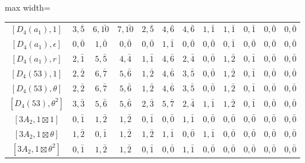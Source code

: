 \begin{table}[ht]
\begin{adjustbox}{max width=\linewidth}
\begin{tabular}{|c|ccccccccccc|}
        $[D_4(a_1), 1]$        & $3, \bar{5}$ & $6, \bar{10}$ & $7, \bar{10}$ & $2, \bar{5}$ & $4, \bar{6}$ & $4, \bar{6}$ & $1, \bar{1}$ & $1, \bar{1}$ & $0, \bar{1}$ & $0, \bar{0}$ & $0, \bar{0}$ \\ 
        $[D_4(a_1), \epsilon]$  & $0, \bar{0}$ & $1, \bar{0}$ & $0, \bar{0}$ & $0, \bar{0}$ & $1, \bar{1}$ & $0, \bar{0}$ & $0, \bar{0}$ & $0, \bar{1}$ & $0, \bar{0}$ & $0, \bar{0}$ & $0, \bar{0}$ \\ 
        $[D_4(a_1), r]$        & $2, \bar{1}$ & $5, \bar{5}$ & $4, \bar{4}$ & $1, \bar{1}$ & $4, \bar{6}$ & $2, \bar{4}$ & $0, \bar{0}$ & $1, \bar{2}$ & $0, \bar{1}$ & $0, \bar{0}$ & $0, \bar{0}$ \\ 
        $[D_4(53), 1]$         & $2, \bar{2}$ & $6, \bar{7}$ & $5, \bar{6}$ & $1, \bar{2}$ & $4, \bar{6}$ & $3, \bar{5}$ & $0, \bar{0}$ & $1, \bar{2}$ & $0, \bar{1}$ & $0, \bar{0}$ & $0, \bar{0}$ \\
        $[D_4(53), \theta]$    & $2, \bar{2}$ & $6, \bar{7}$ & $5, \bar{6}$ & $1, \bar{2}$ & $4, \bar{6}$ & $3, \bar{5}$ & $0, \bar{0}$ & $1, \bar{2}$ & $0, \bar{1}$ & $0, \bar{0}$ & $0, \bar{0}$ \\ 
        $[D_4(53), \theta^2]$  & $3, \bar{3}$ & $5, \bar{6}$ & $5, \bar{6}$ & $2, \bar{3}$ & $5, \bar{7}$ & $2, \bar{4}$ & $1, \bar{1}$ & $1, \bar{2}$ & $0, \bar{1}$ & $0, \bar{0}$ & $0, \bar{0}$ \\ 
        $[3A_2, 1\boxtimes1]$            & $0, \bar{1}$ & $1, \bar{2}$ & $1, \bar{2}$ & $0, \bar{1}$ & $0, \bar{0}$ & $1, \bar{1}$ & $0, \bar{0}$ & $0, \bar{0}$ & $0, \bar{0}$ & $0, \bar{0}$ & $0, \bar{0}$ \\
        $[3A_2, 1\boxtimes\theta]$       & $1, \bar{2}$ & $0, \bar{1}$ & $1, \bar{2}$ & $1, \bar{2}$ & $1, \bar{1}$ & $0, \bar{0}$ & $1, \bar{1}$ & $0, \bar{0}$ & $0, \bar{0}$ & $0, \bar{0}$ & $0, \bar{0}$ \\ 
        $[3A_2, 1\boxtimes\theta^2]$     & $0, \bar{1}$ & $1, \bar{2}$ & $1, \bar{2}$ & $0, \bar{1}$ & $0, \bar{0}$ & $1, \bar{1}$ & $0, \bar{0}$ & $0, \bar{0}$ & $0, \bar{0}$ & $0, \bar{0}$ & $0, \bar{0}$ \\ \hline


\end{tabular}
\end{adjustbox}
\end{table}
